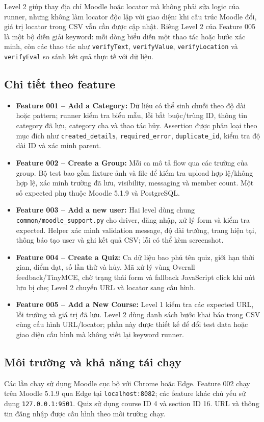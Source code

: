 Level 2 giúp thay địa chỉ Moodle hoặc locator mà không phải sửa logic của runner, nhưng không làm locator độc lập với giao diện: khi cấu trúc Moodle đổi, giá trị locator trong CSV vẫn cần được cập nhật. Riêng Level 2 của Feature 005 là một bộ diễn giải keyword: mỗi dòng biểu diễn một thao tác hoặc bước xác minh, còn các thao tác như \texttt{verifyText}, \texttt{verifyValue}, \texttt{verifyLocation} và \texttt{verifyEval} so sánh kết quả thực tế với dữ liệu.

\subsection{Chi tiết theo feature}
\begin{itemize}
  \item \textbf{Feature 001 -- Add a Category:} Dữ liệu có thể sinh chuỗi theo độ dài hoặc pattern; runner kiểm tra biểu mẫu, lỗi bắt buộc/trùng ID, thông tin category đã lưu, category cha và thao tác hủy. Assertion được phân loại theo mục đích như \texttt{created\_details}, \texttt{required\_error}, \texttt{duplicate\_id}, kiểm tra độ dài ID và xác minh parent.
  \item \textbf{Feature 002 -- Create a Group:} Mỗi ca mô tả flow qua các trường của group. Bộ test bao gồm fixture ảnh và file để kiểm tra upload hợp lệ/không hợp lệ, xác minh trường đã lưu, visibility, messaging và member count. Một số expected phụ thuộc Moodle 5.1.9 và PostgreSQL.
  \item \textbf{Feature 003 -- Add a new user:} Hai level dùng chung \texttt{common/moodle\_support.py} cho driver, đăng nhập, xử lý form và kiểm tra expected. Helper xác minh validation message, độ dài trường, trang hiện tại, thông báo tạo user và ghi kết quả CSV; lỗi có thể kèm screenshot.
  \item \textbf{Feature 004 -- Create a Quiz:} Ca dữ liệu bao phủ tên quiz, giới hạn thời gian, điểm đạt, số lần thử và hủy. Mã xử lý vùng Overall feedback/TinyMCE, chờ trạng thái form và fallback JavaScript click khi nút lưu bị che; Level 2 chuyển URL và locator sang cấu hình.
  \item \textbf{Feature 005 -- Add a New Course:} Level 1 kiểm tra các expected URL, lỗi trường và giá trị đã lưu. Level 2 dùng danh sách bước khai báo trong CSV cùng cấu hình URL/locator; phần này được thiết kế để đổi test data hoặc giao diện cấu hình mà không viết lại keyword runner.
\end{itemize}

\subsection{Môi trường và khả năng tái chạy}
Các lần chạy sử dụng Moodle cục bộ với Chrome hoặc Edge. Feature 002 chạy trên Moodle 5.1.9 qua Edge tại \texttt{localhost:8082}; các feature khác chủ yếu sử dụng \texttt{127.0.0.1:9501}. Quiz sử dụng course ID 4 và section ID 16. URL và thông tin đăng nhập được cấu hình theo môi trường chạy.

